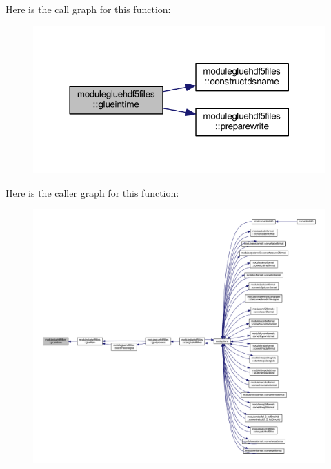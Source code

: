 Here is the call graph for this function\+:\nopagebreak
\begin{figure}[H]
\begin{center}
\leavevmode
\includegraphics[width=318pt]{namespacemodulegluehdf5files_af9077091d4ab6580969f5d961ccc9b22_cgraph}
\end{center}
\end{figure}
Here is the caller graph for this function\+:\nopagebreak
\begin{figure}[H]
\begin{center}
\leavevmode
\includegraphics[width=350pt]{namespacemodulegluehdf5files_af9077091d4ab6580969f5d961ccc9b22_icgraph}
\end{center}
\end{figure}
\mbox{\label{namespacemodulegluehdf5files_a58aecafa3c64f2f6546b818404f30b15}} 
